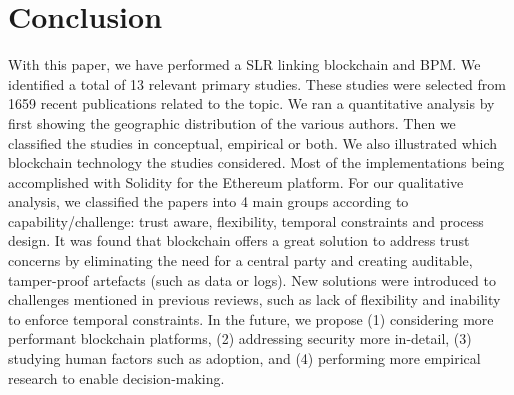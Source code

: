 \section{Conclusion}
With this paper, we have performed a SLR linking blockchain and BPM. We identified a total of 13 relevant primary studies. These studies were selected from 1659 recent publications related to the topic. We ran a quantitative analysis by first showing the geographic distribution of the various authors. Then we classified the studies in conceptual, empirical or both. We also illustrated which blockchain technology the studies considered. Most of the implementations being accomplished with Solidity for the Ethereum platform. For our qualitative analysis, we classified the papers into 4 main groups according to capability/challenge: trust aware, flexibility, temporal constraints and process design. It was found that blockchain offers a great solution to address trust concerns by eliminating the need for a central party and creating auditable, tamper-proof artefacts (such as data or logs). New solutions were introduced to challenges mentioned in previous reviews, such as lack of flexibility and inability to enforce temporal constraints. In the future, we propose (1) considering more performant blockchain platforms, (2) addressing security more in-detail, (3) studying human factors such as adoption, and (4) performing more empirical research to enable decision-making.     
